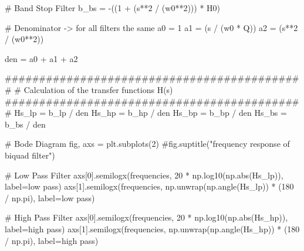 \documentclass[
  letterpaper,
]{scrbook}
\newenvironment{Shaded}{}{}
\newcommand{\BuiltInTok}[1]{\textcolor[rgb]{0.84,0.23,0.29}{#1}}
\newcommand{\CommentTok}[1]{\textcolor[rgb]{0.42,0.45,0.49}{#1}}
\newcommand{\DecValTok}[1]{\textcolor[rgb]{0.00,0.36,0.77}{#1}}
\newcommand{\NormalTok}[1]{\textcolor[rgb]{0.14,0.16,0.18}{#1}}
\newcommand{\OperatorTok}[1]{\textcolor[rgb]{0.14,0.16,0.18}{#1}}
\newcommand{\StringTok}[1]{\textcolor[rgb]{0.01,0.18,0.38}{#1}}
\begin{document}
\begin{codelisting}
{\begin{Shaded}
\begin{Highlighting}[]
\CommentTok{\# Band Stop Filter}
\NormalTok{b\_bs }\OperatorTok{=} \OperatorTok{{-}}\NormalTok{((}\DecValTok{1} \OperatorTok{+}\NormalTok{ (s}\OperatorTok{**}\DecValTok{2} \OperatorTok{/}\NormalTok{ (w0}\OperatorTok{**}\DecValTok{2}\NormalTok{))) }\OperatorTok{*}\NormalTok{ H0)}

\CommentTok{\# Denominator {-}\textgreater{} for all filters the same}
\NormalTok{a0 }\OperatorTok{=} \DecValTok{1}
\NormalTok{a1 }\OperatorTok{=}\NormalTok{ (s }\OperatorTok{/}\NormalTok{ (w0 }\OperatorTok{*}\NormalTok{ Q))}
\NormalTok{a2 }\OperatorTok{=}\NormalTok{ (s}\OperatorTok{**}\DecValTok{2} \OperatorTok{/}\NormalTok{ (w0}\OperatorTok{**}\DecValTok{2}\NormalTok{))}

\NormalTok{den }\OperatorTok{=}\NormalTok{ a0 }\OperatorTok{+}\NormalTok{ a1 }\OperatorTok{+}\NormalTok{ a2}

\CommentTok{\#\#\#\#\#\#\#\#\#\#\#\#\#\#\#\#\#\#\#\#\#\#\#\#\#\#\#\#\#\#\#\#\#\#\#\#\#\#\#\#\#\#\#\#}
\CommentTok{\# Calculation of the transfer functions H(s)}
\CommentTok{\#\#\#\#\#\#\#\#\#\#\#\#\#\#\#\#\#\#\#\#\#\#\#\#\#\#\#\#\#\#\#\#\#\#\#\#\#\#\#\#\#\#\#\#}
\NormalTok{Hs\_lp }\OperatorTok{=}\NormalTok{ b\_lp }\OperatorTok{/}\NormalTok{ den}
\NormalTok{Hs\_hp }\OperatorTok{=}\NormalTok{ b\_hp }\OperatorTok{/}\NormalTok{ den}
\NormalTok{Hs\_bp }\OperatorTok{=}\NormalTok{ b\_bp }\OperatorTok{/}\NormalTok{ den}
\NormalTok{Hs\_bs }\OperatorTok{=}\NormalTok{ b\_bs }\OperatorTok{/}\NormalTok{ den}

\CommentTok{\# Bode Diagram}
\NormalTok{fig, axs }\OperatorTok{=}\NormalTok{ plt.subplots(}\DecValTok{2}\NormalTok{)}
\CommentTok{\#fig.suptitle("frequency response of biquad filter")}

\CommentTok{\# Low Pass Filter}
\NormalTok{axs[}\DecValTok{0}\NormalTok{].semilogx(frequencies, }\DecValTok{20} \OperatorTok{*}\NormalTok{ np.log10(np.}\BuiltInTok{abs}\NormalTok{(Hs\_lp)), label}\OperatorTok{=}\StringTok{\textquotesingle{}low pass\textquotesingle{}}\NormalTok{)}
\NormalTok{axs[}\DecValTok{1}\NormalTok{].semilogx(frequencies, np.unwrap(np.angle(Hs\_lp)) }\OperatorTok{*}\NormalTok{ (}\DecValTok{180} \OperatorTok{/}\NormalTok{ np.pi), label}\OperatorTok{=}\StringTok{\textquotesingle{}low pass\textquotesingle{}}\NormalTok{)}

\CommentTok{\# High Pass Filter}
\NormalTok{axs[}\DecValTok{0}\NormalTok{].semilogx(frequencies, }\DecValTok{20} \OperatorTok{*}\NormalTok{ np.log10(np.}\BuiltInTok{abs}\NormalTok{(Hs\_hp)), label}\OperatorTok{=}\StringTok{\textquotesingle{}high pass\textquotesingle{}}\NormalTok{)}
\NormalTok{axs[}\DecValTok{1}\NormalTok{].semilogx(frequencies, np.unwrap(np.angle(Hs\_hp)) }\OperatorTok{*}\NormalTok{ (}\DecValTok{180} \OperatorTok{/}\NormalTok{ np.pi), label}\OperatorTok{=}\StringTok{\textquotesingle{}high pass\textquotesingle{}}\NormalTok{)}


\end{Highlighting}
\end{Shaded}}
\end{codelisting}
\end{document}
